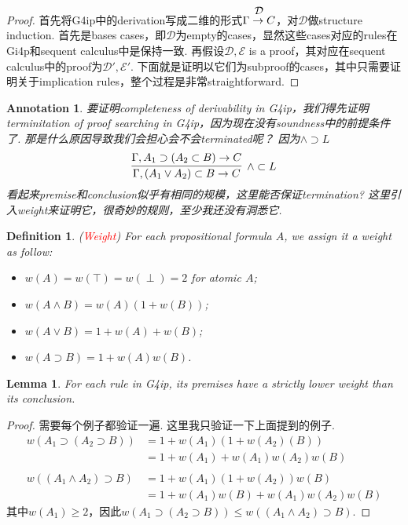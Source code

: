 \documentclass{article}
\theoremstyle{plain}
\newtheorem{lemma}[theorem]{Lemma}
\newtheorem{definition}[theorem]{Definition}
\newtheorem{annotation}[theorem]{Annotation}
\newcounter{case}
\theoremstyle{nonumberplain}
\newtheorem{proof}{Proof}
\newcommand{\redt}[1]{\textcolor{red}{#1}}
\begin{document}
\begin{proof}
\rm  首先将G4ip中的derivation写成二维的形式$\deduce{\Gamma \to C}{\mathcal{D}}$，对$\mathcal{D}$做structure induction. 首先是bases cases，即$\mathcal{D}$为empty的cases，显然这些cases对应的rules在Gi4p和sequent calculus中是保持一致. 再假设$\mathcal{D},\mathcal{E}$ is a proof，其对应在sequent calculus中的proof为$\mathcal{D}',\mathcal{E}'$. 下面就是证明以它们为subproof的cases，其中只需要证明关于implication rules，整个过程是非常straightforward. 
\end{proof}

\begin{annotation}
\rm 要证明completeness of derivability in G4ip，我们得先证明terminitation of proof searching in G4ip，因为现在没有soundness中的前提条件了. 那是什么原因导致我们会担心会不会terminated呢？ 因为$\wedge \supset L$
$$
\infer[\wedge \subset L]{\Gamma, (A_1 \vee A_2) \subset B \to C}{\Gamma, A_1 \supset (A_2 \subset B) \to C}
$$
看起来premise和conclusion似乎有相同的规模，这里能否保证termination? 这里引入weight来证明它，很奇妙的规则，至少我还没有洞悉它. 
\end{annotation}

\begin{definition}
\rm (\redt{Weight}) For each propositional formula $A$, we assign it a weight as follow:
\begin{itemize}
	\item $w(A)=w(\top)=w(\perp) = 2$ for atomic $A$;
	\item $w(A \wedge B) = w(A)(1+w(B))$;
	\item $w(A \vee B) = 1 + w(A) + w(B)$;
	\item $w(A \supset B) = 1 + w(A)w(B)$.
\end{itemize}
\end{definition}

\begin{lemma}\label{amazing-weight}
\rm For each rule in G4ip, its premises have a strictly lower weight than its conclusion. 
\end{lemma}

\begin{proof}
需要每个例子都验证一遍. 这里我只验证一下上面提到的例子. 
$$
\begin{aligned}
w(A_1\supset (A_2 \supset B)) &= 1 + w(A_1)(1+w(A_2)(B)) \\
&= 1 + w(A_1) + w(A_1)w(A_2)w(B)\\\\
w((A_1 \wedge A_2) \supset B) &= 1 + w(A_1)(1+w(A_2))w(B) \\
&=1 + w(A_1)w(B) + w(A_1)w(A_2)w(B)
\end{aligned}
$$
其中$w(A_1) \geq 2$，因此$w(A_1\supset (A_2 \supset B)) \leq w((A_1 \wedge A_2) \supset B)$.
\end{proof}
\end{document}
